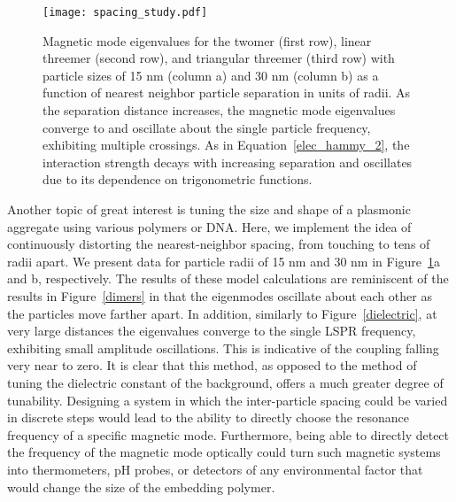 \documentclass[journal=apchd5,manuscript=article]{achemso}
\begin{document}
\begin{figure}
\centering
\texttt{[image: spacing\_study.pdf]}
\caption{Magnetic mode eigenvalues for the twomer (first row), linear threemer (second row), and triangular threemer (third row) with particle sizes of 15 nm (column a) and 30 nm (column b) as a function of nearest neighbor particle separation in units of radii. As the separation distance increases, the magnetic mode eigenvalues converge to and oscillate about the single particle frequency, exhibiting multiple crossings. As in Equation~\ref{elec_hammy_2}, the interaction strength decays with increasing separation and oscillates due to its dependence on trigonometric functions.}
\label{spacing}
\end{figure}

Another topic of great interest is tuning the size and shape of a plasmonic aggregate using various polymers\cite{Ginger2017} or DNA\cite{DanLuo2009,NaLiu2017}. Here, we implement the idea of continuously distorting the nearest-neighbor spacing, from touching to tens of radii apart. We present data for particle radii of 15 nm and 30 nm in Figure~\ref{spacing}a and b, respectively. The results of these model calculations are reminiscent of the results in Figure~\ref{dimers} in that the eigenmodes oscillate about each other as the particles move farther apart. In addition, similarly to Figure~\ref{dielectric}, at very large distances the eigenvalues converge to the single LSPR frequency, exhibiting small amplitude oscillations. This is indicative of the coupling falling very near to zero. It is clear that this method, as opposed to the method of tuning the dielectric constant of the background, offers a much greater degree of tunability. Designing a system in which the inter-particle spacing could be varied in discrete steps would lead to the ability to directly choose the resonance frequency of a specific magnetic mode. Furthermore, being able to directly detect the frequency of the magnetic mode optically could turn such magnetic systems into thermometers, pH probes, or detectors of any environmental factor that would change the size of the embedding polymer.

\end{document}
